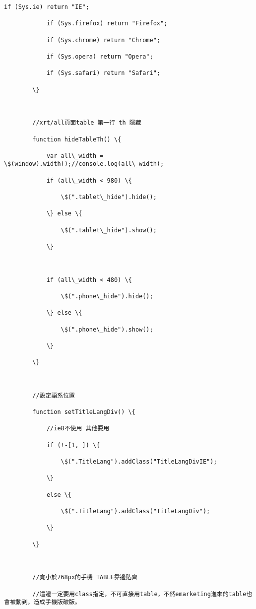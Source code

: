 \documentclass[11pt]{article}
\begin{document}
\begin{Verbatim}[commandchars=\\\{\}]
            if (Sys.ie) return "IE";

            if (Sys.firefox) return "Firefox";

            if (Sys.chrome) return "Chrome";

            if (Sys.opera) return "Opera";

            if (Sys.safari) return "Safari";

        \}



        //xrt/all頁面table 第一行 th 隱藏

        function hideTableTh() \{

            var all\_width = \$(window).width();//console.log(all\_width);

            if (all\_width < 980) \{

                \$(".tablet\_hide").hide();

            \} else \{

                \$(".tablet\_hide").show();

            \}



            if (all\_width < 480) \{

                \$(".phone\_hide").hide();

            \} else \{

                \$(".phone\_hide").show();

            \}

        \}



        //設定語系位置

        function setTitleLangDiv() \{

            //ie8不使用 其他要用

            if (!-[1, ]) \{

                \$(".TitleLang").addClass("TitleLangDivIE");

            \}

            else \{

                \$(".TitleLang").addClass("TitleLangDiv");

            \}

        \}



        //寬小於768px的手機 TABLE靠邊貼齊

        //這邊一定要用class指定，不可直接用table，不然emarketing進來的table也會被動到，造成手機版破版。


\end{Verbatim}
\end{document}
